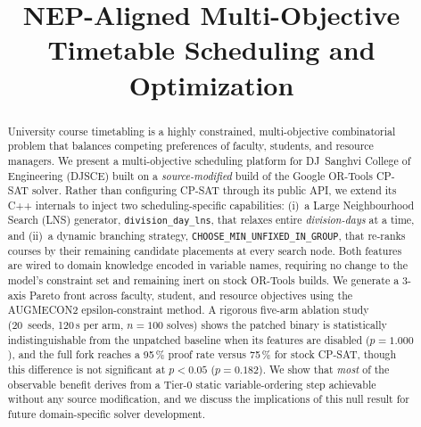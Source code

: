 \documentclass[conference]{IEEEtran}
\begin{document}
\title{NEP-Aligned Multi-Objective Timetable Scheduling and Optimization}

\author{
\IEEEauthorblockN{[Author 1], [Author 2], [Author 3]}
}

\maketitle

\begin{abstract}
University course timetabling is a highly constrained, multi-objective
combinatorial problem that balances competing preferences of faculty, students,
and resource managers. We present a multi-objective scheduling platform for
DJ~Sanghvi College of Engineering (DJSCE) built on a \emph{source-modified}
build of the Google OR-Tools CP-SAT solver. Rather than configuring CP-SAT
through its public API, we extend its C++ internals to inject two
scheduling-specific capabilities: (i)~a Large Neighbourhood Search (LNS)
generator, \texttt{division\_day\_lns}, that relaxes entire
\emph{division-days} at a time, and (ii)~a dynamic branching strategy,
\texttt{CHOOSE\_MIN\_UNFIXED\_IN\_GROUP}, that re-ranks courses by their
remaining candidate placements at every search node. Both features are wired
to domain knowledge encoded in variable names, requiring no change to the
model's constraint set and remaining inert on stock OR-Tools builds. We
generate a 3-axis Pareto front across faculty, student, and resource objectives
using the AUGMECON2 epsilon-constraint method. A rigorous five-arm ablation
study (20~seeds, 120\,s per arm, $n{=}100$ solves) shows the patched binary is
statistically indistinguishable from the unpatched baseline when its features
are disabled ($p{=}1.000$), and the full fork reaches a 95\,\% proof rate
versus 75\,\% for stock CP-SAT, though this difference is not significant at
$p{<}0.05$ ($p{=}0.182$). We show that \emph{most} of the observable benefit
derives from a Tier-0 static variable-ordering step achievable without any
source modification, and we discuss the implications of this null result for
future domain-specific solver development.
\end{abstract}
\end{document}
